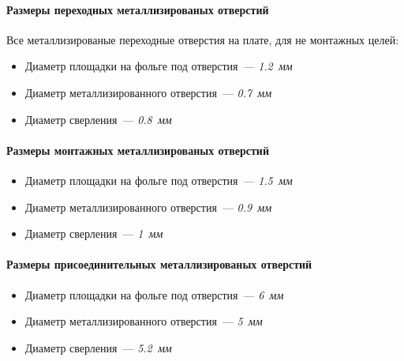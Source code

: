 \paragraph{Размеры переходных металлизированых отверстий}
Все металлизированые переходные отверстия на плате, для не монтажных целей:

\begin{itemize}
    \item Диаметр площадки на фольге под отверстия~--- \textit{1.2~мм}
    \item Диаметр металлизированного отверстия~--- \textit{0.7~мм}
    \item Диаметр сверления~--- \textit{0.8~мм}
\end{itemize}

\paragraph{Размеры монтажных металлизированых отверстий}
\begin{itemize}
    \item Диаметр площадки на фольге под отверстия~--- \textit{1.5~мм}
    \item Диаметр металлизированного отверстия~--- \textit{0.9~мм}
    \item Диаметр сверления~--- \textit{1~мм}
\end{itemize}

\paragraph{Размеры присоединительных металлизированых отверстий}
\begin{itemize}
    \item Диаметр площадки на фольге под отверстия~--- \textit{6~мм}
    \item Диаметр металлизированного отверстия~--- \textit{5~мм}
    \item Диаметр сверления~--- \textit{5.2~мм}
\end{itemize}
